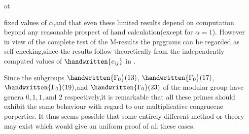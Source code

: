 \begin{flushright}
at 
\end{flushright}

\noindent fixed values of $\alpha$,and that even these limited results depend on computation beyond any reasonable prospect of hand calculation(except for $\alpha=1$). However in view of the complete test of the M-results the prggrams can be regarded as self-checking,since the results follow theoretically from the independently computed values of $\handwritten{c_{ij}}$ in  .

Since the subgroups $\handwritten{\Gamma_{0}}(13)$, $\handwritten{\Gamma_{0}}(17)$, $\handwritten{\Gamma_{0}}(19)$,and $\handwritten{\Gamma_{0}}(23)$ of the modular group have genera $0,1,1,\text{and }2$ respectively,it is remarkable that all these primes should exhibit the same behaviour with regard to our multiplicative congruecne porperties. It thus seems possible that some entirely different method or theory may exist which would give an uniform proof of all these cases.

